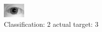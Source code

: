\begin{figure}[h!]
\begin{center}
\includegraphics[width=0.60\columnwidth]{figures/ID1038_class_2_target_3.png}
\end{center}
\caption{ Classification: 2 actual target: 3}
\label{fig:ID1038_class_2_target_3}
\end{figure}
